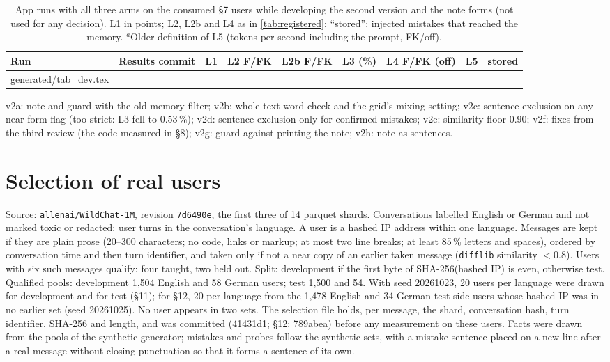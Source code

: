 \documentclass[10pt,twocolumn]{article}
\makeatletter
\newcommand*{\tablebody}[1]{\@@input generated/#1.tex }
\newcommand{\pct}{\,\%}
\makeatother
\begin{document}
\begin{table}[H]
\centering
\small
\caption{App runs with all three arms on the consumed \S7 users while developing the second version and the note forms
(not used for any decision). L1 in points; L2, L2b and L4 as in \cref{tab:registered}; ``stored'': injected mistakes that
reached the memory. $^{a}$Older definition of L5 (tokens per second including the prompt, FK/off).}
\label{tab:dev}
\begin{tabular}{@{}llrllrlrr@{}}
\toprule
Run & Results commit & L1 & L2 F/FK & L2b F/FK & L3 (\%) & L4 F/FK (off) & L5 & stored \\
\midrule
\tablebody{tab_dev}
\bottomrule
\end{tabular}
\end{table}

v2a: note and guard with the old memory filter; v2b: whole-text word check and the grid's mixing setting; v2c: sentence
exclusion on any near-form flag (too strict: L3 fell to 0.53\pct); v2d: sentence exclusion only for confirmed mistakes;
v2e: similarity floor 0.90; v2f: fixes from the third review (the code measured in \S8); v2g: guard against printing the
note; v2h: note as sentences.

\section{Selection of real users}\label{app:selection}

Source: \texttt{allenai/WildChat-1M}, revision \texttt{7d6490e}, the first three of 14 parquet shards. Conversations
labelled English or German and not marked toxic or redacted; user turns in the conversation's language. A user is a
hashed IP address within one language. Messages are kept if they are plain prose (20--300 characters; no code, links or
markup; at most two line breaks; at least 85\pct{} letters and spaces), ordered by conversation time and then turn
identifier, and taken only if not a near copy of an earlier taken message (\texttt{difflib} similarity $< 0.8$). Users
with six such messages qualify: four taught, two held out. Split: development if the first byte of SHA-256(hashed IP) is
even, otherwise test. Qualified pools: development 1{,}504 English and 58 German users; test 1{,}500 and 54. With seed
20261023, 20 users per language were drawn for development and for test (\S11); for \S12, 20 per language from the 1{,}478
English and 34 German test-side users whose hashed IP was in no earlier set (seed 20261025). No user appears in two sets. The selection file
holds, per message, the shard, conversation hash, turn identifier, SHA-256 and length, and was committed (41431d1; \S12:
789abea) before any measurement on these users. Facts were drawn from the pools of the synthetic generator; mistakes and
probes follow the synthetic sets, with a mistake sentence placed on a new line after a real message without closing
punctuation so that it forms a sentence of its own.
\end{document}
